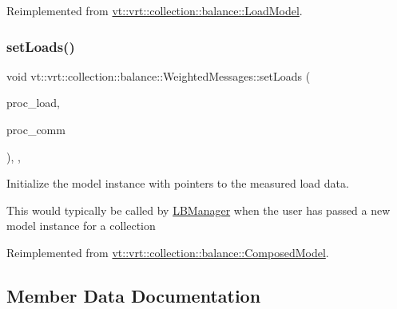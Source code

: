 Reimplemented from \hyperlink{structvt_1_1vrt_1_1collection_1_1balance_1_1_load_model_a0fc694534390dccb0de35e45272515a9}{vt\+::vrt\+::collection\+::balance\+::\+Load\+Model}.

\mbox{\label{structvt_1_1vrt_1_1collection_1_1balance_1_1_weighted_messages_ad0e6b88668ac59f4fb376a2dba81e593}} 
\subsubsection{\texorpdfstring{set\+Loads()}{setLoads()}}
{\footnotesize\ttfamily void vt\+::vrt\+::collection\+::balance\+::\+Weighted\+Messages\+::set\+Loads (\begin{DoxyParamCaption}\item[{std\+::unordered\+\_\+map$<$ \hyperlink{namespacevt_a46ce6733d5cdbd735d561b7b4029f6d7}{Phase\+Type}, \hyperlink{namespacevt_1_1vrt_1_1collection_1_1balance_a5339303db2e1ce964d783a53fd74e6b1}{Load\+Map\+Type} $>$ const $\ast$}]{proc\+\_\+load,  }\item[{std\+::unordered\+\_\+map$<$ \hyperlink{namespacevt_a46ce6733d5cdbd735d561b7b4029f6d7}{Phase\+Type}, \hyperlink{namespacevt_1_1vrt_1_1collection_1_1balance_a01ee1fb0ae2da1d2ab7fdca3be9ae351}{Comm\+Map\+Type} $>$ const $\ast$}]{proc\+\_\+comm }\end{DoxyParamCaption})\hspace{0.3cm}{\ttfamily [inline]}, {\ttfamily [override]}, {\ttfamily [virtual]}}



Initialize the model instance with pointers to the measured load data. 

This would typically be called by \hyperlink{structvt_1_1vrt_1_1collection_1_1balance_1_1_l_b_manager}{L\+B\+Manager} when the user has passed a new model instance for a collection 

Reimplemented from \hyperlink{classvt_1_1vrt_1_1collection_1_1balance_1_1_composed_model_a3a7da5e81a933ea88f87a1226fd3b401}{vt\+::vrt\+::collection\+::balance\+::\+Composed\+Model}.



\subsection{Member Data Documentation}
\mbox{\label{structvt_1_1vrt_1_1collection_1_1balance_1_1_weighted_messages_a0c7747d5f3021dc4a89858a99060c095}} 
